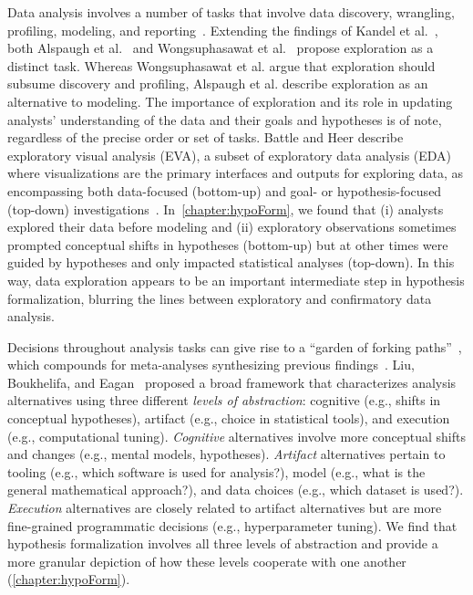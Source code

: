 Data analysis involves a number of tasks that involve data discovery, wrangling,
profiling, modeling, and reporting~\cite{kandel2012enterprise}. Extending the
findings of Kandel et al.~\cite{kandel2012enterprise}, both Alspaugh et
al.~\cite{alspaugh2018futzing} and Wongsuphasawat et
al.~\cite{wongsuphasawat2019EDAgoals} propose exploration as a distinct task.
Whereas Wongsuphasawat et al. argue that exploration should subsume discovery
and profiling, Alspaugh et al. describe exploration as an alternative
to modeling. The importance of exploration and its role in updating analysts'
understanding of the data and their goals and hypotheses is of note, regardless
of the precise order or set of tasks. Battle and Heer describe
exploratory visual analysis (EVA), a subset of exploratory data analysis (EDA)
where visualizations are the primary interfaces and outputs for exploring data,
as encompassing both data-focused (bottom-up) and goal- or hypothesis-focused
(top-down) investigations~\cite{battle2019EVA}. In~\autoref{chapter:hypoForm},
we found that (i) analysts explored their data before modeling and (ii)
exploratory observations sometimes prompted conceptual shifts in hypotheses
(bottom-up) but at other times were guided by hypotheses and only impacted
statistical analyses (top-down). In this way, data exploration appears to be an
important intermediate step in hypothesis formalization, blurring the lines
between exploratory and confirmatory data analysis. 

Decisions throughout analysis tasks can give rise to a ``garden of forking
paths''~\cite{gelman2013garden}, which compounds for meta-analyses synthesizing
previous findings~\cite{kale2019decision}. Liu, Boukhelifa, and
Eagan~\cite{liu2019understanding} proposed a broad framework that characterizes
analysis alternatives using three different \textit{levels of abstraction}:
cognitive (e.g., shifts in conceptual hypotheses), artifact (e.g., choice in
statistical tools), and execution (e.g., computational tuning).
\textit{Cognitive} alternatives involve more conceptual shifts and changes
(e.g., mental models, hypotheses). \textit{Artifact} alternatives pertain to
tooling (e.g., which software is used for analysis?), model (e.g., what is the
general mathematical approach?), and data choices (e.g., which dataset is
used?). \textit{Execution} alternatives are closely related to artifact
alternatives but are more fine-grained programmatic decisions (e.g.,
hyperparameter tuning). We find that hypothesis formalization involves all three
levels of abstraction and provide a more granular depiction of how these levels
cooperate with one another (\autoref{chapter:hypoForm}). 

